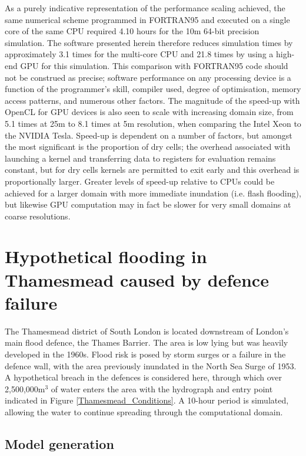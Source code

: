 As a purely indicative representation of the performance scaling achieved, the same numerical scheme programmed in FORTRAN95 and executed on a single core of the same CPU required 4.10 hours for the 10m 64-bit precision simulation. The software presented herein therefore reduces simulation times by approximately 3.1 times for the multi-core CPU and 21.8 times by using a high-end GPU for this simulation. This comparison with FORTRAN95 code should not be construed as precise; software performance on any processing device is a function of the programmer's skill, compiler used, degree of optimisation, memory access patterns, and numerous other factors. The magnitude of the speed-up with OpenCL for GPU devices is also seen to scale with increasing domain size, from 5.1 times at 25m to 8.1 times at 5m resolution, when comparing the Intel Xeon to the NVIDIA Tesla. Speed-up is dependent on a number of factors, but amongst the most significant is the proportion of dry cells; the overhead associated with launching a kernel and transferring data to registers for evaluation remains constant, but for dry cells kernels are permitted to exit early and this overhead is proportionally larger. Greater levels of speed-up relative to CPUs could be achieved for a larger domain with more immediate inundation (i.e. flash flooding), but likewise GPU computation may in fact be slower for very small domains at coarse resolutions.

\section{Hypothetical flooding in Thamesmead caused by defence failure}

The Thamesmead district of South London is located downstream of London's main flood defence, the Thames Barrier. The area is low lying but was heavily developed in the 1960s. Flood risk is posed by storm surges or a failure in the defence wall, with the area previously inundated in the North Sea Surge of 1953. A hypothetical breach in the defences is considered here, through which over 2,500,000m$^{3}$ of water enters the area with the hydrograph and entry point indicated in Figure \ref{Thamesmead_Conditions}. A 10-hour period is simulated, allowing the water to continue spreading through the computational domain.

\subsection{Model generation}

